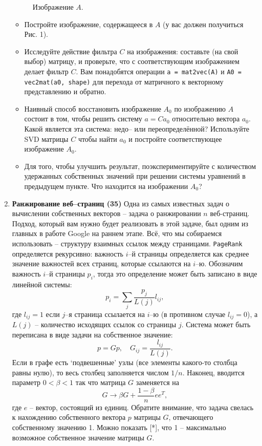 \documentclass[prb,papersize=a4paper,notitlepage]{revtex4-1}%
\begin{document}
\begin{enumerate}
\begin{figure}[h!]
\caption{Изображение $A$.}
\label{subs}
\end{figure}
\begin{itemize}
\item Постройте изображение, содержащееся в $A$ (у вас должен получиться Рис. 1).
\item Исследуйте действие фильтра $C$ на изображения: составьте (на свой выбор) матрицу, и проверьте, что с соответствующим изображением делает фильтр $C$. Вам понадобятся операции \lstinline{a = mat2vec(A)} и \lstinline{A0 = vec2mat(a0, shape)} для перехода от матричного к векторному представлению и обратно.
\item Наивный способ восстановить изображение $A_0$ по изображению $A$ состоит в том, чтобы решить систему $a = C a_0$ относительно вектора $a_0$. Какой является эта система: недо-- или переопределённой? Используйте SVD матрицы $C$ чтобы найти $a_0$ и постройте соответствующее изображение $A_0$.
\item Для того, чтобы улучшить результат, поэкспериментируйте с количеством удержанных собственных значений при решении системы уравнений в предыдущем пункте. Что находится на изображении $A_0$?
\end{itemize}
\item \textbf{Ранжирование веб--страниц (35)} Одна из самых известных задач о вычислении собственных векторов -- задача о ранжировании $n$ веб-страниц. Подход, который вам нужно будет реализовать в этой задаче, был одним из главных в работе Google на раннем этапе. Всё, что мы собираемся использовать -- структуру взаимных ссылок между страницами. \lstinline{PageRank} определяется рекурсивно: важность $i$--й страницы определяется как среднее значение важностей всех страниц, которые ссылаются на $i$--ю. Обозначим важность $i$--й страницы $p_i$, тогда это определение может быть записано в виде линейной системы:
$$ p_i = \sum_{j} \frac{p_j}{L(j)}l_{ij}, $$
где $l_{ij}=1$ если $j$--я страница ссылается на $i$--ю (в противном случае $l_{ij}=0$), а $L(j)$ -- количество исходящих ссылок со страницы $j$. Система может быть переписана в виде задачи на собственное значение:
$$ p = G p, \quad G_{ij} = \frac{l_{ij}}{L(j)}.$$ Если в графе есть `подвешенные' узлы (все элементы какого-то столбца равны нулю), то весь столбец заполняется числом $1/n$. Наконец, вводится параметр $0<\beta<1$ так что матрица $G$ заменяется на
$$
G\to \beta G + \frac{1-\beta}{n} e e^T,
$$
где $e$ -- вектор, состоящий из единиц. Обратите внимание, что задача свелась к нахождению собственного вектора $p$ матрицы $G$, отвечающего собственному значению 1.  Можно показать [*], что  1 -- максимально возможное собственное значение матрицы $G$.


\end{enumerate}
\end{document}
